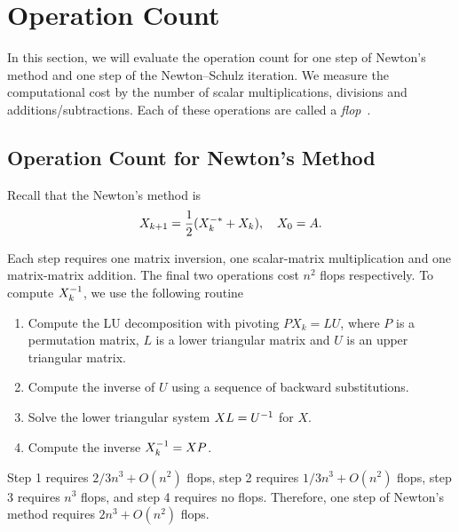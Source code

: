 \documentclass[12pt]{article}
\begin{document}
\section{Operation Count}
In this section, we will evaluate the operation count for one step of Newton's method and one step of the Newton--Schulz iteration. We measure the computational cost by the number of scalar
multiplications, divisions and additions/subtractions. Each of these operations are called a \emph{flop}~.

\subsection{Operation Count for Newton's Method}
Recall that the Newton's method is 
\begin{equation}
    \notag 
    X_{k+1} = \frac 12(X_k^{-*} + X_k),\quad X_0 = A.
\end{equation}

Each step requires one matrix inversion, one scalar-matrix multiplication and one matrix-matrix addition. The final two operations cost $n^2$ flops respectively. To compute $X_k^{-1}$, we use the following routine
\begin{enumerate}
    \item Compute the LU decomposition with pivoting $PX_k = LU$, where $P$ is a permutation matrix, $L$ is a lower triangular matrix and $U$ is an upper triangular matrix.
    \item Compute the inverse of $U$ using a sequence of backward substitutions.
    \item Solve the lower triangular system $XL = U^{-1}$ for $X$.
    \item Compute the inverse $X_k^{-1} = XP$.
\end{enumerate}

Step 1 requires $2/3n^3 + O(n^2)$ flops, step 2 requires $1/3n^3 + O(n^2)$ flops, step 3 requires $n^3$ flops, and step 4 requires no flops. Therefore, one step of Newton's method requires $2n^3 + O(n^2)$ flops.
\end{document}
